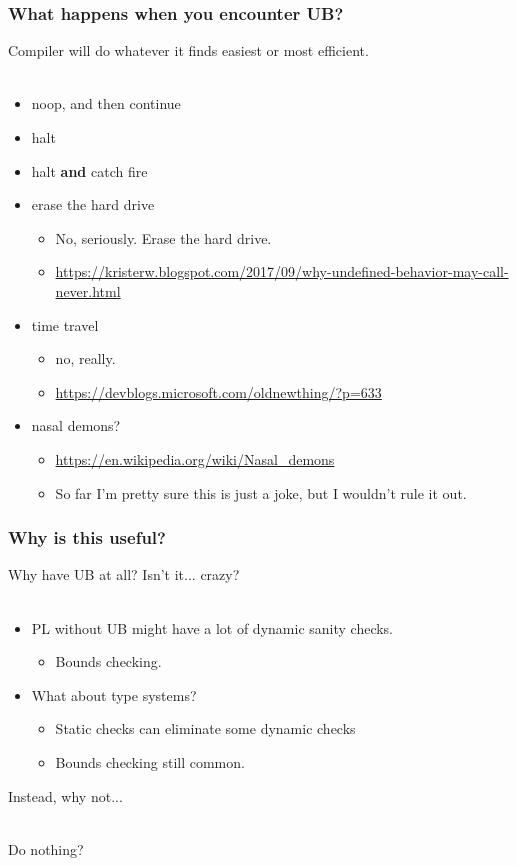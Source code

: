 \documentclass{beamer}
\begin{document}
\begin{frame}
  \frametitle{What happens when you encounter UB?}

  Compiler will do whatever it finds easiest or most efficient.\\~

  \begin{itemize}
  \item noop, and then continue
  \item halt
  \item halt {\bf and} catch fire
  \item erase the hard drive
    \pause
    \begin{itemize}
    \item No, seriously. Erase the hard drive.
    \item \url{https://kristerw.blogspot.com/2017/09/why-undefined-behavior-may-call-never.html}
    \end{itemize}
    \pause
  \item time travel
    \pause
    \begin{itemize}
    \item no, really.
    \item \url{https://devblogs.microsoft.com/oldnewthing/?p=633}
    \end{itemize}
    \pause
  \item nasal demons?
    \pause
    \begin{itemize}
    \item \url{https://en.wikipedia.org/wiki/Nasal\_demons}
      \pause
    \item So far I'm pretty sure this is just a joke, but I wouldn't
      rule it out.
    \end{itemize}
  \end{itemize}
\end{frame}

\begin{frame}
  \frametitle{Why is this useful?}

  Why have UB at all? Isn't it... {\tiny crazy?} \\~

  \pause

  \begin{itemize}
  \item PL without UB might have a lot of dynamic sanity checks.
    \begin{itemize}
    \item Bounds checking.
    \end{itemize}
    \pause
  \item What about type systems?
    \begin{itemize}
    \item Static checks can eliminate some dynamic checks
    \item Bounds checking still common.
    \end{itemize}
  \end{itemize}

  Instead, why not...\\~
  \pause

  Do nothing?
\end{frame}
\end{document}
